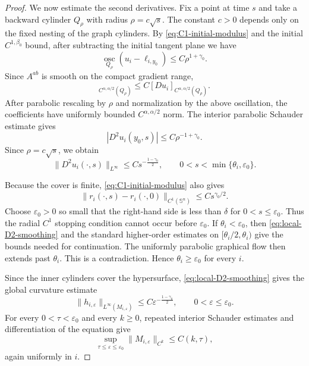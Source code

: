 \documentclass[10pt,a4paper]{amsart}
\numberwithin{equation}{section}
\begin{document}
\begin{proof}
We now estimate the second derivatives. Fix a point at time $s$ and take a backward cylinder $Q_\rho$ with radius $\rho=c\sqrt{s}$. The constant $c>0$ depends only on the fixed nesting of the graph cylinders. By \eqref{eq:C1-initial-modulus} and the initial $C^{1,\beta_0}$ bound, after subtracting the initial tangent plane we have
\begin{equation*}
 \operatorname*{osc}_{Q_\rho}(u_i-\ell_{i,y_0})\leq C\rho^{1+\gamma_0}.
\end{equation*}
Since $A^{ab}$ is smooth on the compact gradient range,
\begin{equation*}
 [A^{ab}(Du_i)]_{C^{\alpha,\alpha/2}(Q_\rho)}
 \leq C[Du_i]_{C^{\alpha,\alpha/2}(Q_\rho)}.
\end{equation*}
After parabolic rescaling by $\rho$ and normalization by the above oscillation, the coefficients have uniformly bounded $C^{\alpha,\alpha/2}$ norm. The interior parabolic Schauder estimate \cite[Theorem~4.9]{Lie96} gives
\begin{equation*}
 |D^2u_i(y_0,s)|\leq C\rho^{-1+\gamma_0}.
\end{equation*}
Since $\rho=c\sqrt{s}$, we obtain
\begin{equation}
\label{eq:local-D2-smoothing}
 \|D^2u_i(\cdot,s)\|_{L^\infty}
 \leq C s^{-\frac{1-\gamma_0}{2}},
 \qquad 0<s<\min\{\theta_i,\varepsilon_0\}.
\end{equation}

Because the cover is finite, \eqref{eq:C1-initial-modulus} also gives
\begin{equation*}
 \|r_i(\cdot,s)-r_i(\cdot,0)\|_{C^1(\mathbb S^n)}
 \leq C s^{\gamma_0/2}.
\end{equation*}
Choose $\varepsilon_0>0$ so small that the right-hand side is less than $\delta$ for $0<s\leq\varepsilon_0$. Thus the radial $C^1$ stopping condition cannot occur before $\varepsilon_0$. If $\theta_i<\varepsilon_0$, then \eqref{eq:local-D2-smoothing} and the standard higher-order estimates on $[\theta_i/2,\theta_i)$ give the bounds needed for continuation. The uniformly parabolic graphical flow then extends past $\theta_i$. This is a contradiction. Hence $\theta_i\geq\varepsilon_0$ for every $i$.

Since the inner cylinders cover the hypersurface, \eqref{eq:local-D2-smoothing} gives the global curvature estimate
\begin{equation}
\label{eq:curvature-smoothing}
 \|h_{i,\varepsilon}\|_{L^\infty(M_{i,\varepsilon})}
 \leq C\varepsilon^{-\frac{1-\gamma_0}{2}},
 \qquad 0<\varepsilon\leq\varepsilon_0.
\end{equation}
For every $0<\tau<\varepsilon_0$ and every $k\geq0$, repeated interior Schauder estimates \cite[Theorem~4.9]{Lie96} and differentiation of the equation give
\begin{equation}
\label{eq:AMCF-higher-uniform}
 \sup_{\tau\leq\varepsilon\leq\varepsilon_0}
 \|M_{i,\varepsilon}\|_{C^k}\leq C(k,\tau),
\end{equation}
again uniformly in $i$.


\end{proof}
\end{document}
